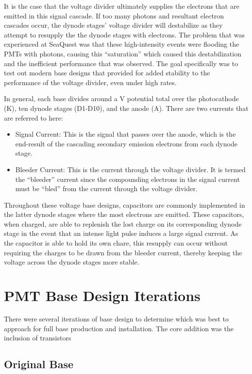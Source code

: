 It is the case that the voltage divider ultimately supplies the electrons that are emitted in this signal cascade. If too many photons and resultant electron cascades occur, the dynode stages' voltage divider will destabilize as they attempt to resupply the the dynode stages with electrons. The problem that was experienced at SeaQuest was that these high-intensity events were flooding the PMTs with photons, causing this ``saturation'' which caused this destabilization and the inefficient performance that was observed. The goal specifically was to test out modern base designs that provided for added stability to the performance of the voltage divider, even under high rates.

In general, each base divides around a \unit[-1500]{V} potential total over the photocathode (K), ten dynode stages (D1-D10), and the anode (A). There are two currents that are referred to here:
\begin{itemize}
	\item Signal Current: This is the signal that passes over the anode, which is the end-result of the cascading secondary emission electrons from each dynode stage.
	\item Bleeder Current: This is the current through the voltage divider. It is termed the ``bleeder'' current since the compounding electrons in the signal current must be ``bled'' from the current through the voltage divider.
\end{itemize}

Throughout these voltage base designs, capacitors are commonly implemented in the latter dynode stages where the most electrons are emitted. These capacitors, when charged, are able to replenish the lost charge on its corresponding dynode stage in the event that an intense light pulse induces a large signal current.  As the capacitor is able to hold its own chare, this resupply can occur without requiring the charges to be drawn from the bleeder current, thereby keeping the voltage across the dynode stages more stable.

\section{PMT Base Design Iterations}

There were several iterations of base design to determine which was best to approach for full base production and installation. The core addition was the inclusion of transistors

\subsection{Original Base}

